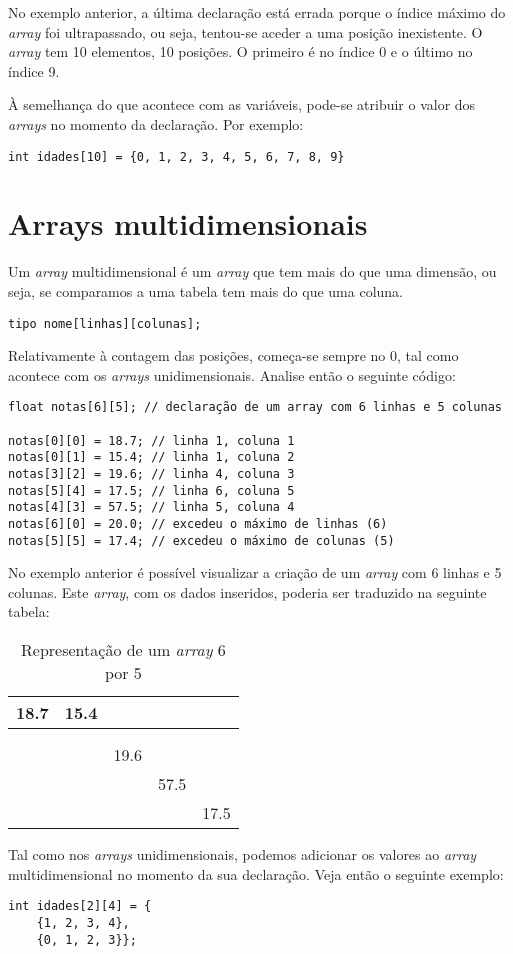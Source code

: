No exemplo anterior, a última declaração está errada porque o índice máximo do \textit{array} foi ultrapassado, ou seja, tentou-se aceder a uma posição inexistente. O \textit{array} tem 10 elementos, 10 posições. O primeiro é no índice 0 e o último no índice 9.

À semelhança do que acontece com as variáveis, pode-se atribuir o valor dos \textit{arrays} no momento da declaração. Por exemplo:

\begin{lstlisting}
int idades[10] = {0, 1, 2, 3, 4, 5, 6, 7, 8, 9}
\end{lstlisting}

\section{Arrays multidimensionais}

Um \textit{array} multidimensional é um \textit{array} que tem mais do que uma dimensão, ou seja, se comparamos a uma tabela tem mais do que uma coluna. 

\begin{lstlisting}
tipo nome[linhas][colunas];
\end{lstlisting}

Relativamente à contagem das posições, começa-se sempre no 0, tal como acontece com os \textit{arrays} unidimensionais. Analise então o seguinte código:

\begin{lstlisting}
float notas[6][5]; // declaração de um array com 6 linhas e 5 colunas

notas[0][0] = 18.7; // linha 1, coluna 1
notas[0][1] = 15.4; // linha 1, coluna 2
notas[3][2] = 19.6; // linha 4, coluna 3
notas[5][4] = 17.5; // linha 6, coluna 5
notas[4][3] = 57.5; // linha 5, coluna 4
notas[6][0] = 20.0; // excedeu o máximo de linhas (6)
notas[5][5] = 17.4; // excedeu o máximo de colunas (5)
\end{lstlisting}

No exemplo anterior é possível visualizar a criação de um \textit{array} com 6 linhas e 5 colunas. Este \textit{array}, com os dados inseridos, poderia ser traduzido na seguinte tabela:

\begin{table}[h]
\begin{center}
\begin{tabular}{|l|l|l|l|l|}
\hline
18.7 & 15.4 &      &      &      \\ \hline
     &      &      &      &      \\ \hline
     &      &      &      &      \\ \hline
     &      & 19.6 &      &      \\ \hline
     &      &      & 57.5 &      \\ \hline
     &      &      &      & 17.5 \\ \hline
\end{tabular}
\end{center}
\caption{Representação de um \textit{array} 6 por 5}
\end{table}

Tal como nos \textit{arrays} unidimensionais, podemos adicionar os valores ao \textit{array} multidimensional no momento da sua declaração. Veja então o seguinte exemplo:

\begin{lstlisting}
int idades[2][4] = {
    {1, 2, 3, 4},
    {0, 1, 2, 3}};
\end{lstlisting}